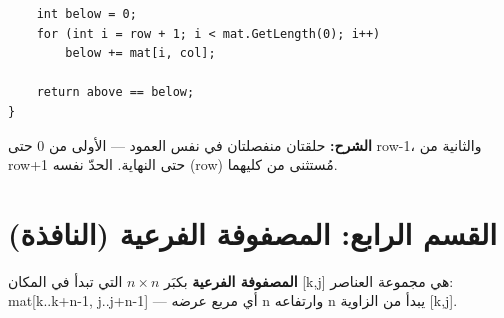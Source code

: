 \documentclass[14pt]{extarticle}
\begin{document}
\begin{enumerate}[itemsep=2em]
\begin{boxSolution}
\begin{boxCode}
\begin{english}
\begin{verbatim}
    int below = 0;
    for (int i = row + 1; i < mat.GetLength(0); i++)
        below += mat[i, col];

    return above == below;
}
\end{verbatim}
\end{english}
\end{boxCode}
\textbf{الشرح:} حلقتان منفصلتان في نفس العمود — الأولى من 0 حتى \textenglish{row-1}، والثانية من \textenglish{row+1} حتى النهاية. الحدّ نفسه (\textenglish{row}) مُستثنى من كليهما.
\end{boxSolution}
\fi

\end{enumerate}

\clearpage
\section*{القسم الرابع: المصفوفة الفرعية (النافذة)}

\begin{boxDef}
\textbf{المصفوفة الفرعية} بكبَر $n \times n$ التي تبدأ في المكان \textenglish{[k,j]} هي مجموعة العناصر:
\textenglish{mat[k..k+n-1, j..j+n-1]} — أي مربع عرضه \textenglish{n} وارتفاعه \textenglish{n} يبدأ من الزاوية \textenglish{[k,j]}.
\end{boxDef}
\end{document}

